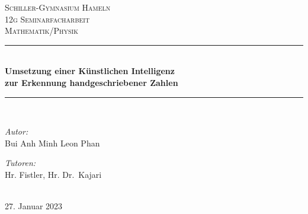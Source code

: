 \documentclass[11pt]{article}
\begin{document}
\begin{titlepage}

    \newcommand{\HRule}{\rule{\linewidth}{0.5mm}}
    \centering
    \textsc{\LARGE Schiller-Gymnasium Hameln}\\[1.5cm] %
    \textsc{\Large 12g Seminarfacharbeit}\\[0.5cm] %
    \textsc{\Large Mathematik/Physik}\\[0.5cm]
    
    
    \HRule{} \\[0.4cm]
    { \huge \bfseries Umsetzung einer Künstlichen Intelligenz
    \\zur Erkennung handgeschriebener Zahlen}\\[0.4cm] %
    \HRule{} \\[1.5cm]
     
    
    \begin{minipage}{0.4\textwidth}
    \begin{flushleft} \large
    \emph{Autor:}\\
    Bui Anh Minh Leon Phan\\
    \end{flushleft}
    \end{minipage}
    \begin{minipage}{0.4\textwidth}
    \begin{flushright} \large
    \emph{Tutoren:} \\
    Hr. Fistler, Hr. Dr.\ Kajari\\
    \end{flushright}
    \end{minipage}\\[2cm]
    
    
    {\large 27. Januar 2023}\\[2cm] %
    

\end{titlepage}
\end{document}
